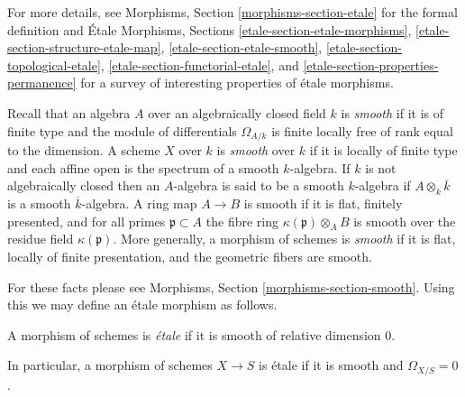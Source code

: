 \noindent
For more details, see
Morphisms, Section \ref{morphisms-section-etale}
for the formal definition and
\'Etale Morphisms, Sections
\ref{etale-section-etale-morphisms},
\ref{etale-section-structure-etale-map},
\ref{etale-section-etale-smooth},
\ref{etale-section-topological-etale},
\ref{etale-section-functorial-etale}, and
\ref{etale-section-properties-permanence}
for a survey of interesting properties of \'etale morphisms.

\medskip\noindent
Recall that an algebra $A$ over an algebraically closed field $k$ is
{\it smooth} if it is of finite type and the module of differentials
$\Omega_{A/k}$ is finite locally free of rank equal to the dimension.
A scheme $X$ over $k$ is {\it smooth} over $k$ if it is locally of finite
type and each affine open is the spectrum of a smooth $k$-algebra.
If $k$ is not algebraically closed then an $A$-algebra is said to be
a smooth $k$-algebra if $A \otimes_k \overline{k}$ is a smooth
$\overline{k}$-algebra. A ring map $A \to B$ is smooth if it is
flat, finitely presented, and for all primes $\mathfrak p \subset A$
the fibre ring $\kappa(\mathfrak p) \otimes_A B$ is smooth over the residue
field $\kappa(\mathfrak p)$. More generally, a morphism of schemes is
{\it smooth} if it is flat, locally of finite presentation, and the
geometric fibers are smooth.

\medskip\noindent
For these facts please see
Morphisms, Section \ref{morphisms-section-smooth}.
Using this we may define an \'etale morphism as follows.

\begin{definition}
\label{definition-etale-morphism}
A morphism of schemes is {\it \'etale} if it is smooth of relative dimension 0.
\end{definition}

\noindent
In particular, a morphism of schemes $X \to S$ is \'etale if it is smooth
and $\Omega_{X/S} = 0$.

